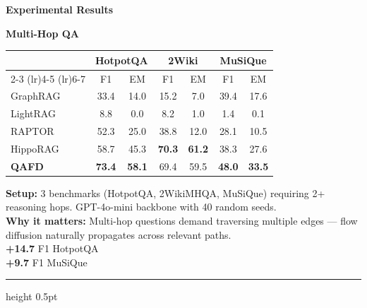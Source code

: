 \documentclass[final]{beamer}
\newlength{\colC}\setlength{\colC}{0.26\paperwidth}   %
\begin{document}
\begin{frame}[t]
\begin{columns}[t]
\begin{column}{\colC}
\begin{block}{\Large\textbf{\color{samsungblue} Experimental Results}}
\setlength{\intextsep}{0pt}
\setlength{\columnsep}{1em}

\textbf{\large\color{samsungblue} Multi-Hop QA}\par\vspace{0.3em}
\begin{table}
\vspace{-0.8em}
\scriptsize
\begin{tabular}{l cc cc cc}
  \toprule
  & \multicolumn{2}{c}{\textbf{HotpotQA}} & \multicolumn{2}{c}{\textbf{2Wiki}} & \multicolumn{2}{c}{\textbf{MuSiQue}} \\
  \cmidrule(lr){2-3} \cmidrule(lr){4-5} \cmidrule(lr){6-7}
  & F1 & EM & F1 & EM & F1 & EM \\
  \midrule
  GraphRAG  & 33.4 & 14.0 & 15.2 & 7.0  & 39.4 & 17.6 \\
  LightRAG  & 8.8  & 0.0  & 8.2  & 1.0  & 1.4  & 0.1  \\
  RAPTOR    & 52.3 & 25.0 & 38.8 & 12.0 & 28.1 & 10.5 \\
  HippoRAG & 58.7 & 45.3 & \textbf{70.3} & \textbf{61.2} & 38.3 & 27.6 \\
  \midrule
  \textbf{QAFD} & \textbf{73.4} & \textbf{58.1} & 69.4 & 59.5 & \textbf{48.0} & \textbf{33.5} \\
  \bottomrule
\end{tabular}
\vspace{-0.8em}
\end{table}
\noindent\scriptsize
\textbf{Setup:} 3 benchmarks (HotpotQA, 2WikiMHQA, MuSiQue) requiring 2+ reasoning hops. GPT-4o-mini backbone with 40 random seeds.\\[3pt]
\textbf{Why it matters:} Multi-hop questions demand traversing multiple edges --- flow diffusion naturally propagates across relevant paths.\\[3pt]
\colorbox{accentgreen!15}{\textcolor{accentgreen}{\textbf{+14.7}} F1 HotpotQA}\\[2pt]
\colorbox{accentgreen!15}{\textcolor{accentgreen}{\textbf{+9.7}} F1 MuSiQue}\par
\vspace{0.5em}
{\color{samsungblue!30}\hrule height 0.5pt}
\vspace{0.5em}


\end{block}
\end{column}
\end{columns}
\end{frame}
\end{document}
